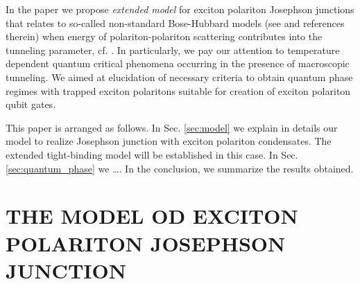 \documentclass[aps, pre, preprint, groupedaddress, superscriptaddress, showkeys, showpacs] {revtex4-1}
\begin{document}
In the paper we propose \textit{extended model} for exciton polariton Josephson junctions that relates to so-called non-standard Bose-Hubbard models (see \cite{Dutta} and references therein) when energy of polariton-polariton scattering contributes into the tunneling parameter, cf. \cite{Aleiner, Shelykh_2008, Borgh_2010, Solnyshkov_2008, Sarchi}.
In particularly, we pay our attention to temperature dependent quantum critical phenomena occurring in the presence of macroscopic tunneling.
We aimed at elucidation of necessary criteria to obtain quantum phase regimes with trapped exciton polaritons suitable for creation of exciton polariton qubit gates.

This paper is arranged as follows.
In Sec. \ref{sec:model} we explain in details our model to realize Josephson junction with exciton polariton condensates.
The extended tight-binding model will be established in this case.
In Sec. \ref{sec:quantum_phase} we {\red \dots }.
In the conclusion, we summarize the results obtained.

\section{THE MODEL OD EXCITON POLARITON JOSEPHSON JUNCTION \label{sec:model}}
\end{document}
